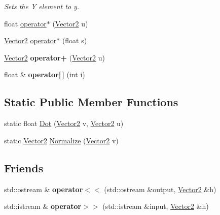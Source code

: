 \begin{DoxyCompactItemize}
\begin{DoxyCompactList}\small\item\em Sets the Y element to y. \end{DoxyCompactList}\item 
float \hyperlink{classBrickware_1_1Math_1_1Vector2_a0c8d4897608d71fe4284760ee32ec0c4}{operator$\ast$} (\hyperlink{classBrickware_1_1Math_1_1Vector2}{Vector2} u)
\item 
\hyperlink{classBrickware_1_1Math_1_1Vector2}{Vector2} \hyperlink{classBrickware_1_1Math_1_1Vector2_adf90d2d5f45f0be0880e54318e40f150}{operator$\ast$} (float s)
\item 
\hypertarget{classBrickware_1_1Math_1_1Vector2_ac4b719e1b87723ccb1dd86938ffce6fe}{}\hyperlink{classBrickware_1_1Math_1_1Vector2}{Vector2} {\bfseries operator+} (\hyperlink{classBrickware_1_1Math_1_1Vector2}{Vector2} u)\label{classBrickware_1_1Math_1_1Vector2_ac4b719e1b87723ccb1dd86938ffce6fe}

\item 
\hypertarget{classBrickware_1_1Math_1_1Vector2_a4f25da8e6d15fb603d3e8d5e0b3866b9}{}float \& {\bfseries operator\mbox{[}$\,$\mbox{]}} (int i)\label{classBrickware_1_1Math_1_1Vector2_a4f25da8e6d15fb603d3e8d5e0b3866b9}

\end{DoxyCompactItemize}
\subsection*{Static Public Member Functions}
\begin{DoxyCompactItemize}
\item 
static float \hyperlink{classBrickware_1_1Math_1_1Vector2_a177899682163de9f59a1f94ce2a9fcca}{Dot} (\hyperlink{classBrickware_1_1Math_1_1Vector2}{Vector2} v, \hyperlink{classBrickware_1_1Math_1_1Vector2}{Vector2} u)
\item 
static \hyperlink{classBrickware_1_1Math_1_1Vector2}{Vector2} \hyperlink{classBrickware_1_1Math_1_1Vector2_a6be2da5753966fc17ab8c0f80d31ac3d}{Normalize} (\hyperlink{classBrickware_1_1Math_1_1Vector2}{Vector2} v)
\end{DoxyCompactItemize}
\subsection*{Friends}
\begin{DoxyCompactItemize}
\item 
\hypertarget{classBrickware_1_1Math_1_1Vector2_adeae991ed4b7fd36fdd2825f1465541a}{}std\+::ostream \& {\bfseries operator$<$$<$} (std\+::ostream \&output, \hyperlink{classBrickware_1_1Math_1_1Vector2}{Vector2} \&h)\label{classBrickware_1_1Math_1_1Vector2_adeae991ed4b7fd36fdd2825f1465541a}

\item 
\hypertarget{classBrickware_1_1Math_1_1Vector2_a2a7d7e231c02d5daed89b38d874b39c9}{}std\+::istream \& {\bfseries operator$>$$>$} (std\+::istream \&input, \hyperlink{classBrickware_1_1Math_1_1Vector2}{Vector2} \&h)\label{classBrickware_1_1Math_1_1Vector2_a2a7d7e231c02d5daed89b38d874b39c9}

\end{DoxyCompactItemize}


